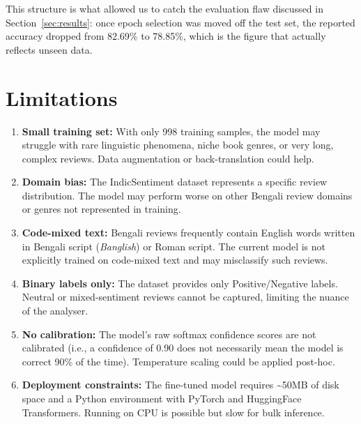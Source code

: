 \documentclass[11pt,a4paper]{article}
\begin{document}
This structure is what allowed us to catch the evaluation flaw discussed in Section~\ref{sec:results}: once epoch selection was moved off the test set, the reported accuracy dropped from 82.69\% to 78.85\%, which is the figure that actually reflects unseen data.

\section{Limitations}

\begin{enumerate}
    \item \textbf{Small training set:} With only 998 training samples, the model may struggle with rare linguistic phenomena, niche book genres, or very long, complex reviews. Data augmentation or back-translation could help.

    \item \textbf{Domain bias:} The IndicSentiment dataset represents a specific review distribution. The model may perform worse on other Bengali review domains or genres not represented in training.

    \item \textbf{Code-mixed text:} Bengali reviews frequently contain English words written in Bengali script (\textit{Banglish}) or Roman script. The current model is not explicitly trained on code-mixed text and may misclassify such reviews.

    \item \textbf{Binary labels only:} The dataset provides only Positive/Negative labels. Neutral or mixed-sentiment reviews cannot be captured, limiting the nuance of the analyser.

    \item \textbf{No calibration:} The model's raw softmax confidence scores are not calibrated (i.e., a confidence of 0.90 does not necessarily mean the model is correct 90\% of the time). Temperature scaling could be applied post-hoc.

    \item \textbf{Deployment constraints:} The fine-tuned model requires \textasciitilde{}50MB of disk space and a Python environment with PyTorch and HuggingFace Transformers. Running on CPU is possible but slow for bulk inference.
\end{enumerate}

\end{document}
